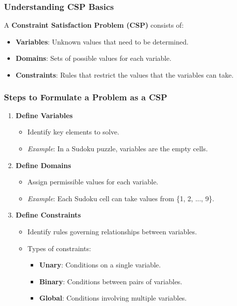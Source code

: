\documentclass[aspectratio=169]{beamer}
\begin{document}
\begin{frame}[fragile]
    \frametitle{Understanding CSP Basics}
    A \textbf{Constraint Satisfaction Problem (CSP)} consists of:
    \begin{itemize}
        \item \textbf{Variables}: Unknown values that need to be determined.
        \item \textbf{Domains}: Sets of possible values for each variable.
        \item \textbf{Constraints}: Rules that restrict the values that the variables can take.
    \end{itemize}
\end{frame}

\begin{frame}[fragile]
    \frametitle{Steps to Formulate a Problem as a CSP}
    \begin{enumerate}
        \item \textbf{Define Variables}
            \begin{itemize}
                \item Identify key elements to solve.
                \item \textit{Example}: In a Sudoku puzzle, variables are the empty cells.
            \end{itemize}
        
        \item \textbf{Define Domains}
            \begin{itemize}
                \item Assign permissible values for each variable.
                \item \textit{Example}: Each Sudoku cell can take values from \{1, 2, ..., 9\}.
            \end{itemize}
        
        \item \textbf{Define Constraints}
            \begin{itemize}
                \item Identify rules governing relationships between variables.
                \item Types of constraints:
                    \begin{itemize}
                        \item \textbf{Unary}: Conditions on a single variable.
                        \item \textbf{Binary}: Conditions between pairs of variables.
                        \item \textbf{Global}: Conditions involving multiple variables.
                    \end{itemize}
            \end{itemize}
    \end{enumerate}
\end{frame}
\end{document}

